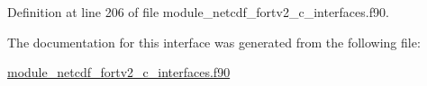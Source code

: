 Definition at line 206 of file module\+\_\+netcdf\+\_\+fortv2\+\_\+c\+\_\+interfaces.\+f90.



The documentation for this interface was generated from the following file\+:\begin{DoxyCompactItemize}
\item 
\hyperlink{module__netcdf__fortv2__c__interfaces_8f90}{module\+\_\+netcdf\+\_\+fortv2\+\_\+c\+\_\+interfaces.\+f90}\end{DoxyCompactItemize}

